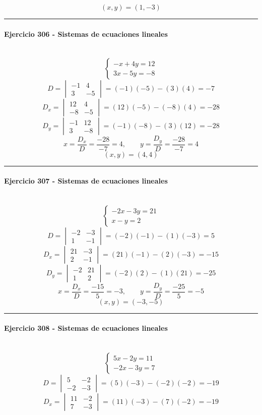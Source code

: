 \documentclass[10pt,a4paper]{article}
\newcommand{\res}[1]{\paragraph{#1}\mbox{}\\[-1.2em]}
\begin{document}
\[ \boxed{(x,y)=(1,-3)} \]
\vspace{1mm}\hrule\vspace{2mm}
\res{Ejercicio 306 - Sistemas de ecuaciones lineales}
\[ \begin{cases}- x + 4 y=12\\3 x - 5 y=-8\end{cases} \]
\[ D=\begin{vmatrix}-1&4\\3&-5\end{vmatrix}=(-1)(-5)-(3)(4)=-7 \]
\[ D_x=\begin{vmatrix}12&4\\-8&-5\end{vmatrix}=(12)(-5)-(-8)(4)=-28 \]
\[ D_y=\begin{vmatrix}-1&12\\3&-8\end{vmatrix}=(-1)(-8)-(3)(12)=-28 \]
\[ x=\frac{D_x}{D}=\frac{-28}{-7}=4,\qquad y=\frac{D_y}{D}=\frac{-28}{-7}=4 \]
\[ \boxed{(x,y)=(4,4)} \]
\vspace{1mm}\hrule\vspace{2mm}
\res{Ejercicio 307 - Sistemas de ecuaciones lineales}
\[ \begin{cases}- 2 x - 3 y=21\\x - y=2\end{cases} \]
\[ D=\begin{vmatrix}-2&-3\\1&-1\end{vmatrix}=(-2)(-1)-(1)(-3)=5 \]
\[ D_x=\begin{vmatrix}21&-3\\2&-1\end{vmatrix}=(21)(-1)-(2)(-3)=-15 \]
\[ D_y=\begin{vmatrix}-2&21\\1&2\end{vmatrix}=(-2)(2)-(1)(21)=-25 \]
\[ x=\frac{D_x}{D}=\frac{-15}{5}=-3,\qquad y=\frac{D_y}{D}=\frac{-25}{5}=-5 \]
\[ \boxed{(x,y)=(-3,-5)} \]
\vspace{1mm}\hrule\vspace{2mm}
\res{Ejercicio 308 - Sistemas de ecuaciones lineales}
\[ \begin{cases}5 x - 2 y=11\\- 2 x - 3 y=7\end{cases} \]
\[ D=\begin{vmatrix}5&-2\\-2&-3\end{vmatrix}=(5)(-3)-(-2)(-2)=-19 \]
\[ D_x=\begin{vmatrix}11&-2\\7&-3\end{vmatrix}=(11)(-3)-(7)(-2)=-19 \]
\end{document}

